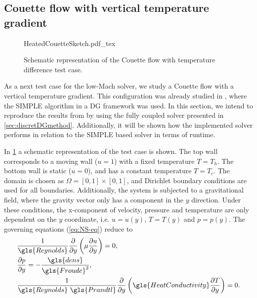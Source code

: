 
\subsection{Couette flow with vertical temperature gradient} \label{ssec:CouetteFlowTempDiff}
\begin{figure}[tb]
	\begin{center}
		\def\svgwidth{0.5\textwidth}
		{HeatedCouetteSketch.pdf_tex}
		\caption{Schematic representation of the Couette flow with temperature difference test case.}
		\label{fig:CouetteTempDiff_scheme}
	\end{center}
\end{figure}
As a next test case for the low-Mach solver, we study a Couette flow with a vertical temperature gradient. This configuration was already studied in \citep{kleinHighorderDiscontinuousGalerkin2016}, where the SIMPLE algorithm in a DG framework was used. 
In this section, we intend to reproduce the results from \citep{kleinHighorderDiscontinuousGalerkin2016} by using the fully coupled solver presented in \cref{sec:discretDGmethod}. Additionally, it will be shown how the implemented solver performs in relation to the SIMPLE based solver in terms of runtime.

In \cref{fig:CouetteTempDiff_scheme} a schematic representation of the test case is shown. The top wall corresponds to a moving wall ($u = 1$) with a fixed temperature $T=T_h$. The bottom wall is static ($u = 0$), and has a constant temperature $T = T_c$.
The domain is chosen as $\Omega = [0,1]\times[0,1]$, and Dirichlet boundary conditions are used for all boundaries. Additionally, the system is subjected to a gravitational field, where the gravity vector only has a component in the $y$ direction. Under these conditions, the x-component of velocity, pressure and temperature are only dependent on the $y$ coordinate, i.e. $u = u(y)$, $T = T(y)$ and $p = p(y)$. The governing equations (\cref{eq:NS-eq}) reduce to 
\begin{align}
	 & \frac{1}{\gls{Reynolds}} \pfrac{ }{y}\left(\mu\pfrac{u}{y}\right) = 0,                                  \\
	 & \pfrac{p}{y} = -\frac{\gls{dens}}{\gls{Froude}^2},                                                      \\
	 & \frac{1}{\gls{Reynolds}~\gls{Prandtl}} \pfrac{ }{y}\left(\gls{HeatConductivity}\pfrac{T}{y}\right) = 0.
\end{align}

